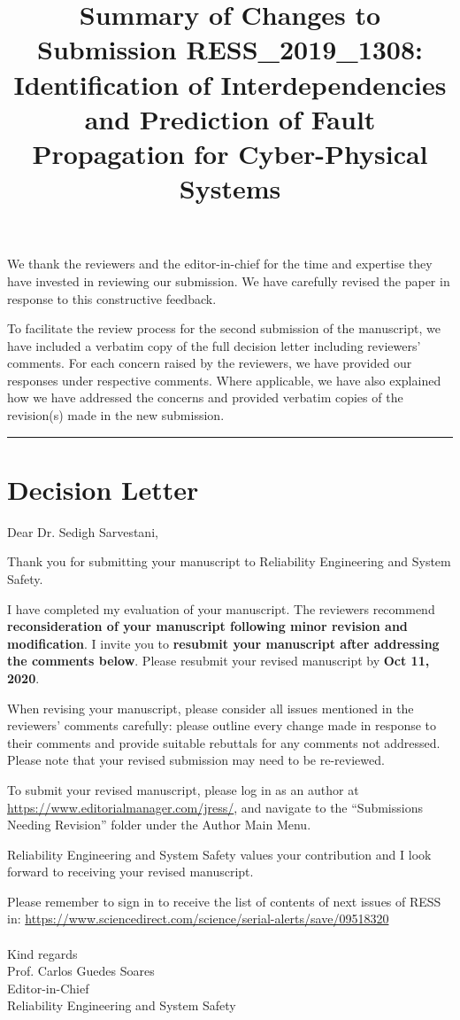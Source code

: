 \documentclass{article}
\title{Summary of Changes to Submission RESS\_2019\_1308: \\
Identification of Interdependencies and Prediction of Fault Propagation for Cyber-Physical Systems}
\date{}
\begin{document}
\maketitle
\noindent
We thank the reviewers and the editor-in-chief for the time and expertise they have invested in reviewing our submission. We have carefully revised the paper in response to this constructive feedback.

To facilitate the review process for the second submission of the manuscript, we have included a verbatim copy of the full decision letter including reviewers' comments. For each concern raised by the reviewers, we have provided our responses under respective comments. Where applicable, we have also explained how we have addressed the concerns and provided verbatim copies of the revision(s) made in the new submission. \vspace{3em}

\noindent\rule[0.5ex]{\linewidth}{1pt}

\section{Decision Letter}
\label{sec:decision_letter}
Dear Dr. Sedigh Sarvestani,

Thank you for submitting your manuscript to Reliability Engineering and System Safety.

I have completed my evaluation of your manuscript. The reviewers recommend \textbf{reconsideration of your manuscript following minor revision and modification}. I invite you to \textbf{resubmit your manuscript after addressing the comments below}. Please resubmit your
revised manuscript by \textbf{Oct 11, 2020}.

When revising your manuscript, please consider all issues mentioned in the reviewers' comments carefully: please outline every change made in response to their comments and provide suitable rebuttals for any comments not addressed. Please note that your revised submission may need to be re-reviewed.

To submit your revised manuscript, please log in as an author at \url{https://www.editorialmanager.com/jress/}, and navigate to the ``Submissions Needing Revision'' folder under the Author Main Menu.

Reliability Engineering and System Safety values your contribution and I look forward to receiving your revised manuscript.

Please remember to sign in to receive the list of contents of next issues of RESS in: \url{https://www.sciencedirect.com/science/serial-alerts/save/09518320} \\ \\
Kind regards \\
Prof. Carlos Guedes Soares \\
Editor-in-Chief \\
Reliability Engineering and System Safety
\end{document}
